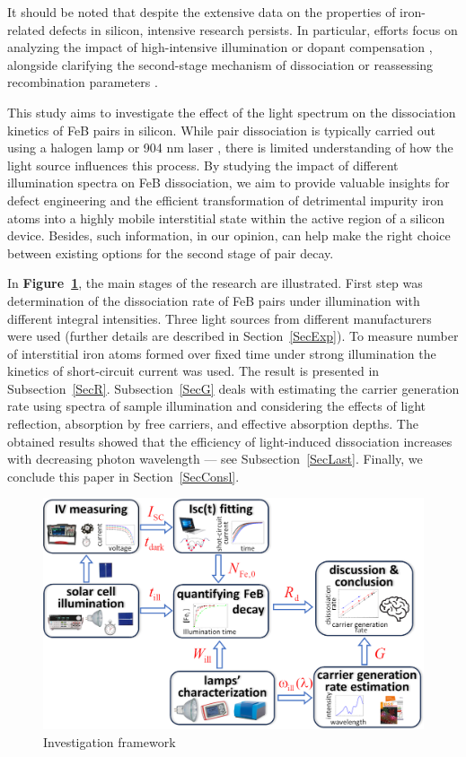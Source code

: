 \documentclass{WileyMSP-template}
\begin{document}
It should be noted that despite the extensive data on the properties of iron-related defects in silicon, intensive research persists.
In particular, efforts focus on analyzing the impact of high-intensive  illumination \cite{FeBStrongIll}
or dopant compensation \cite{Zhu2015},
alongside clarifying the second-stage mechanism of dissociation \cite{Sun2021}
or reassessing recombination parameters \cite{Le2024}.

This study aims to investigate the effect of the light spectrum on the dissociation kinetics of FeB pairs in silicon.
While pair dissociation is typically carried out using a halogen lamp \cite{FeBLight2,Sun2021}
or 904 nm laser \cite{FeBStrongIll,FeBAssJAP2014,lauer2016}, there is limited understanding of how the light source influences this process.
By studying the impact of different illumination spectra on FeB dissociation,
we aim to provide valuable insights for defect engineering and the efficient transformation of detrimental impurity iron atoms into a highly mobile interstitial state
within the active region of a silicon device.
Besides, such information, in our opinion, can help make the right choice between existing options for the second stage of pair decay.

In \textbf{Figure~\ref{fig1}}, the main stages of the research are illustrated.
First step was determination of the dissociation rate of FeB pairs under illumination with different integral intensities.
Three light sources from different manufacturers were used (further details are described in Section~\ref{SecExp}).
To measure number of interstitial iron atoms formed over fixed time under strong illumination the kinetics of short-circuit current was used.
The result is presented in Subsection~\ref{SecR}.
Subsection~\ref{SecG} deals with estimating the carrier generation rate using spectra of sample illumination and considering the effects of light reflection,
absorption by free carriers, and effective absorption depths.
The obtained results showed that the efficiency of light-induced dissociation increases with decreasing photon wavelength --- see Subsection~\ref{SecLast}.
Finally, we conclude this paper in Section~\ref{SecConsl}.

\begin{figure}
\centering
  \includegraphics[width=0.5\linewidth]{Fig1.png}
  \caption{Investigation framework}
  \label{fig1}
\end{figure}
\end{document}
